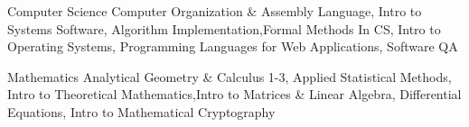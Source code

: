 
\vspace{0mm}
\begin{cvskills}

  \vspace{1mm}

  \cvskill
    {Computer Science} %
    {Computer Organization \& Assembly Language, Intro to Systems Software, Algorithm Implementation,\newline Formal Methods In CS, Intro to Operating Systems, Programming Languages for Web Applications, Software QA} %

   \cvskill
    {Mathematics} %
	{Analytical Geometry \& Calculus 1-3, Applied Statistical Methods, Intro to Theoretical Mathematics,\newline Intro to Matrices \& Linear Algebra, Differential Equations, Intro to Mathematical Cryptography} %


\end{cvskills}

